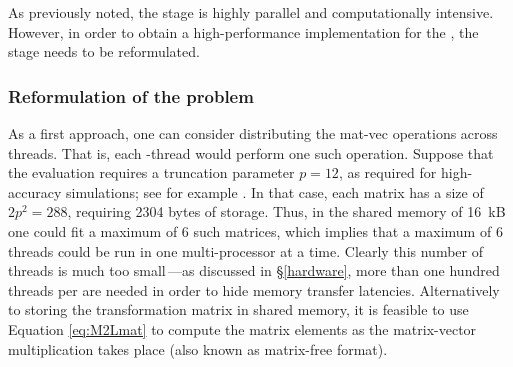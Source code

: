 As previously noted, the {\ML} stage is highly parallel and computationally intensive. However, in order to obtain a high-performance implementation for the {\gpu}, the {\ML} stage needs to be reformulated.

\subsubsection{Reformulation of the {\ML} problem}

As a first approach,  one can consider distributing the mat-vec operations across threads.  That is, each {\cuda}-thread would perform one such operation.  Suppose that the evaluation requires a truncation parameter $p=12$, as required for high-accuracy simulations; see for example \cite{CruzBarba2009}. In that case, each matrix has a size of $2p^2=288$, requiring 2304 bytes of storage.  Thus, in the {\gpu} shared memory of 16~kB one could fit a maximum of $6$ such matrices, which implies that a maximum of $6$ threads could be run in one multi-processor at a time. Clearly this number of threads is much too small\,---as discussed in \S\ref{hardware}, more than one hundred threads per {\sm} are needed in order to hide memory transfer latencies. Alternatively to storing the transformation matrix in shared memory, it is feasible to use Equation \eqref{eq:M2Lmat} to compute the matrix elements as the matrix-vector multiplication takes place (also known as matrix-free format). 
